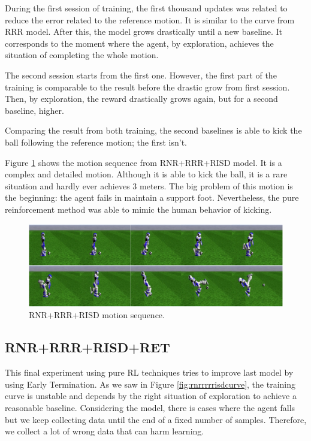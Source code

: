 During the first session of training, the first thousand updates was related to reduce the error related to the reference motion. It is similar to the curve from RRR model. After this, the model grows drastically until a new baseline. It corresponds to the moment where the agent, by exploration, achieves the situation of completing the whole motion.

The second session starts from the first one. However, the first part of the training is comparable to the result before the drastic grow from first session. Then, by exploration, the reward drastically grows again, but for a second baseline, higher.

Comparing the result from both training, the second baselines is able to kick the ball following the reference motion; the first isn't.

Figure \ref{fig:risdmotionsequence} shows the motion sequence from RNR+RRR+RISD model. It is a complex and detailed motion. Although it is able to kick the ball, it is a rare situation and hardly ever achieves 3 meters. The big problem of this motion is the beginning: the agent fails in maintain a support foot. Nevertheless, the pure reinforcement method was able to mimic the human behavior of kicking.

\begin{figure}[!htbp]
	\centering
	\includegraphics[width=1.0\textwidth]{Cap6/risdmotionsequence.eps}
	\caption{RNR+RRR+RISD motion sequence.}
	\label{fig:risdmotionsequence}
\end{figure}


\subsection{RNR+RRR+RISD+RET}

This final experiment using pure RL techniques tries to improve last model by using Early Termination. As we saw in Figure \ref{fig:rnrrrrrisdcurve}, the training curve is unstable and depends by the right situation of exploration to achieve a reasonable baseline. Considering the model, there is cases where the agent falls but we keep collecting data until the end of a fixed number of samples. Therefore, we collect a lot of wrong data that can harm learning.

